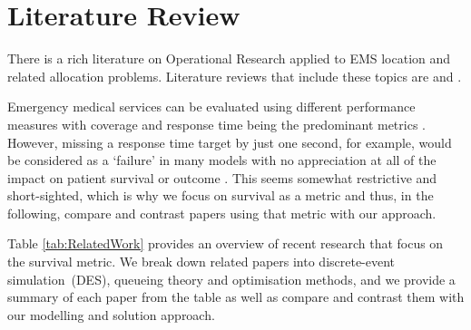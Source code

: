 \documentclass[preprint,12pt]{elsarticle}
\begin{document}
\section{Literature Review}\label{sec:litreview}
There is a rich literature on Operational Research applied to EMS location and related allocation problems. Literature reviews that include these topics are \citet{aringhieri2017emergency, belanger2019recent, farahani2019or, Li2011, Liu2021, reuter2017logistics} and \citet{wang2021emergency}.

Emergency medical services can be evaluated using different performance measures with coverage and response time being the predominant metrics \cite{Mclay2010evaluating}. However, missing a response time target by just one second, for example, would be considered as a `failure' in many models with no appreciation at all of the impact on patient survival or outcome \cite{Mclay2010evaluating}. This seems somewhat restrictive and short-sighted, which is why we focus on survival as a metric and thus, in the following, compare and contrast papers using that metric with our approach.

Table \ref{tab:RelatedWork} provides an overview of recent research that focus on the survival metric. We break down related papers into discrete-event simulation~(DES), queueing theory and optimisation methods, and we provide a summary of each paper from the table as well as compare and contrast them with our modelling and solution approach.

\begin{table}[htbp]
\centering
\small
{}
\caption{Break down of related research that focuses on survival.\label{tab:RelatedWork}}
\end{table}

\FloatBarrier
\end{document}
